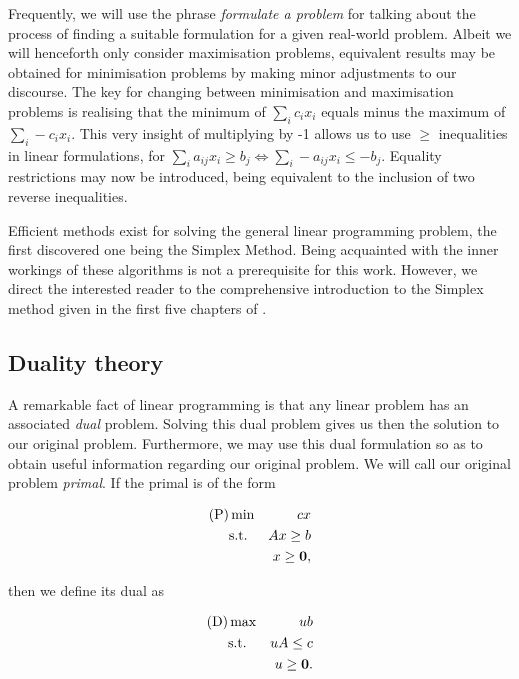 Frequently, we will use the phrase \emph{formulate a problem} for talking about
the process of finding a suitable formulation for a given real-world problem.
Albeit we will henceforth only consider maximisation problems, equivalent results
may be obtained for minimisation problems by making minor adjustments to our
discourse.  The key for changing between minimisation and maximisation problems
is realising that the minimum of $\sum_i c_i x_i$ equals minus the maximum of
$\sum_i -c_i x_i$. This very insight of multiplying by -1 allows us to use
$\geq$ inequalities in linear formulations, for
$
    \sum_i a_{ij} x_i \geq b_j \iff \sum_i -a_{ij} x_i \leq -b_j
$.
Equality restrictions may now be introduced, being equivalent to the inclusion
of two reverse inequalities.

Efficient methods exist for solving the general linear programming problem, the
first discovered one being the Simplex Method. Being acquainted with the inner
workings of these algorithms is not a prerequisite for this work. However, we
direct the interested reader to the comprehensive introduction to the Simplex
method given in the first five chapters of \cite{ba:linear}.

\subsection{Duality theory} %
\label{ssc:int:lp:duality-theory}

A remarkable fact of linear programming is that any linear problem has an
associated \emph{dual} problem. Solving this dual problem gives us then the
solution to our original problem. Furthermore, we may use this dual formulation
so as to obtain useful information regarding our original problem. We will call
our original problem \emph{primal}. If the primal is of the form

\begin{eqnarray*}
    \rm{(P)} & \min
        & cx\\
    &\text{s.t.}
        & Ax \geq b\\
    &   &  x \geq \vec{0},
\end{eqnarray*}

\noindent
then we define its dual as

\begin{eqnarray*}\label{eq:dual}
    \rm{(D)} & \max
        & ub\\
    &\text{s.t.}
        & uA \leq c\\
    &   & u  \geq \vec{0}.
\end{eqnarray*}

